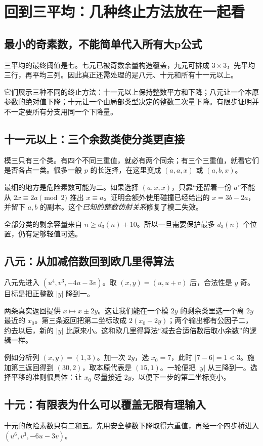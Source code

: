 \chapter{回到三平均：几种终止方法放在一起看}\label{ch:three}
\section{最小的奇素数，不能简单代入所有大p公式}
三平均的最终阈值是七。七元已被奇数余量构造覆盖，九元可排成 $3\times3$，先平均三行，再平均三列。因此真正还需处理的是八元、十元和所有十一元以上。

它们展示三种不同的终止方法：十一元以上保持整数平方和下降；八元让一个本原参数的绝对值下降；十元让一个由局部类型决定的整数二次量下降。有限步证明并不一定要所有分支用同一个下降量。

\section{十一元以上：三个余数类使分类更直接}
模三只有三个类。有四个不同三重值，就必有两个同余；有三个三重值，就看它们是否各占一类。很多一般 $p$ 的长选择，在这里变成 $(a,a,x)$ 或 $(a,b,x)$。

最细的地方是危险素数可能为二。如果选择 $(a,x,x)$，只靠“还留着一份 $a$”不能从 $2x\equiv2a\pmod2$ 推出 $x\equiv a$。证明会额外使用碰撞已经给出的 $x=3b-2a$，并留下 $a,b$ 的副本。这个\emph{已知的整数仿射关系}修复了模二失效。

全部分类的剩余容量来自 $n\ge d_3(n)+10$。所以一旦需要保护最多 $d_3(n)$ 个位置，仍有足够轻值可选。

\section{八元：从加减倍数回到欧几里得算法}
八元先进入 $(u^4,v^3,-4u-3v)$。取 $(x,y)=(u,u+v)$ 后，合法性是 $y$ 奇。目标是把正整数 $|y|$ 降到一。

两条真实返回提供 $x\mapsto x\pm2y$。这让我们能在一个模 $2y$ 的剩余类里选一个离 $2y$ 最近的 $x_0$。第三条返回把第二坐标改成 $2(x_0-2y)$；两个输出都有公因子二，约去以后，新的 $|y|$ 比原来小。这和欧几里得算法“减去合适倍数后取小余数”的逻辑一样。

例如分析列 $(x,y)=(1,3)$。加一次 $2y$，选 $x_0=7$，此时 $|7-6|=1<3$。施加第三返回得到 $(30,2)$，取本原代表是 $(15,1)$。一轮便把 $|y|$ 从三降到一。选择平移的准则很具体：让 $x_0$ 尽量接近 $2y$，以便下一步的第二坐标变小。

\section{十元：有限表为什么可以覆盖无限有理输入}
十元的危险素数只有二和五。先用安全整数下降取得六重值，再经一个四步桥进入 $(u^6,v^3,-6u-3v)$。

